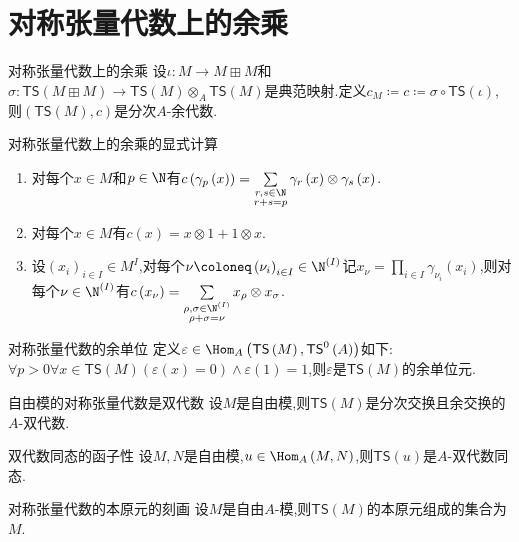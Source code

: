 \section{对称张量代数上的余乘}

\begin{definition}{对称张量代数上的余乘}{}
	设$\iota:M\to M\boxplus M$和$\sigma:\mathsf{TS}\left(M\boxplus M\right)\to\mathsf{TS}\left(M\right)\otimes_{A}\mathsf{TS}\left(M\right)$是典范映射.定义$c_{M}\coloneq c\coloneq\sigma\circ\mathsf{TS}\left(\iota\right)$,则$\left(\mathsf{TS}\left(M\right),c\right)$是分次$A$-余代数.
\end{definition}

\begin{proposition}{对称张量代数上的余乘的显式计算}{}
	\begin{enumerate}
		\item 对每个$x\in M$和$p\in\N$有$c\left(\gamma_{p}\left(x\right)\right)=\sum\limits_{\substack{r,s\in\N\\r+s=p}}\gamma_{r}\left(x\right)\otimes\gamma_{s}\left(x\right)$.
		\item 对每个$x\in M$有$c\left(x\right)=x\otimes 1+1\otimes x$.
		\item 设$\left(x_{i}\right)_{i\in I}\in M^{I}$,对每个$\nu\coloneq\left(\nu_{i}\right)_{i\in I}\in\N^{\left(I\right)}$记$x_{\nu}=\prod\limits_{i\in I}\gamma_{\nu_{i}}\left(x_{i}\right)$,则对每个$\nu\in\N^{\left(I\right)}$有$c\left(x_{\nu}\right)=\sum\limits_{\substack{\rho,\sigma\in\N^{\left(I\right)}\\ \rho+\sigma=\nu}}x_{\rho}\otimes x_{\sigma}$.
	\end{enumerate}
\end{proposition}

\begin{definition}{对称张量代数的余单位}{}
	定义$\varepsilon\in\Hom_{A}\left(\mathsf{TS}\left(M\right),\mathsf{TS}^{0}\left(A\right)\right)$如下:$\forall p>0\forall x\in\mathsf{TS}\left(M\right)\left(\varepsilon\left(x\right)=0\right)\wedge\varepsilon\left(1\right)=1$,则$\varepsilon$是$\mathsf{TS}\left(M\right)$的余单位元.
\end{definition}

\begin{proposition}{自由模的对称张量代数是双代数}{}
	设$M$是自由模,则$\mathsf{TS}\left(M\right)$是分次交换且余交换的$A$-双代数.
\end{proposition}

\begin{proposition}{双代数同态的函子性}{}
	设$M,N$是自由模,$u\in\Hom_{A}\left(M,N\right)$,则$\mathsf{TS}\left(u\right)$是$A$-双代数同态.
\end{proposition}

\begin{proposition}{对称张量代数的本原元的刻画}{}
	设$M$是自由$A$-模,则$\mathsf{TS}\left(M\right)$的本原元组成的集合为$M$.
\end{proposition}







